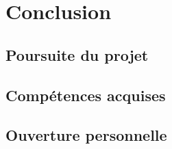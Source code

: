 \section{Conclusion}

\subsection{Poursuite du projet}

\subsection{Compétences acquises}

\subsection{Ouverture personnelle}
